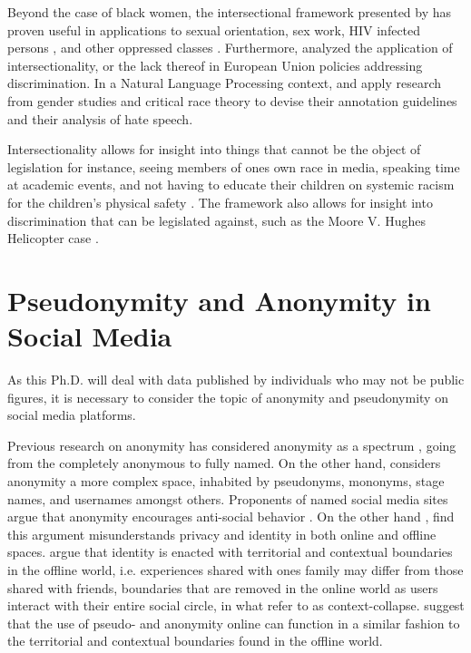 Beyond the case of black women, the intersectional framework presented by \cite{Crenshaw:1989} has proven useful in applications to sexual orientation, sex work, HIV infected persons \citep{Logie:2011}, and other oppressed classes \citep{Erevelles:2010}. Furthermore, \cite{Verloo:2006} analyzed the application of intersectionality, or the lack thereof in European Union policies addressing discrimination. In a Natural Language Processing context, \cite{Waseem-Hovy:2016} and \cite{Waseem:2016} apply research from gender studies and critical race theory to devise their annotation guidelines and their analysis of hate speech.

Intersectionality allows for insight into things that cannot be the object of legislation for instance, seeing members of ones own race in media, speaking time at academic events, and not having to educate their children on systemic racism for the children's physical safety \citep{McIntosh:1988}. The framework also allows for insight into discrimination that can be legislated against, such as the Moore V. Hughes Helicopter case \citep{Crenshaw:1989}.

\section{Pseudonymity and Anonymity in Social Media}\label{sec:pseudonymity}

As this Ph.D. will deal with data published by individuals who may not be public figures, it is necessary to consider the topic of anonymity and pseudonymity on social media platforms.

Previous research on anonymity has considered anonymity as a spectrum \citep{Qian:2007,Donath:1999}, going from the completely anonymous to fully named. On the other hand, \cite{Nagel:2015} considers anonymity a more complex space, inhabited by pseudonyms, mononyms, stage names, and usernames amongst others. Proponents of named social media sites argue that anonymity encourages anti-social behavior \citep{Galperin:2011}. On the other hand \cite{Nagel:2015}, find this argument misunderstands privacy and identity in both online and offline spaces. \cite{Nagel:2015} argue that identity is enacted with territorial and contextual boundaries in the offline world, i.e. experiences shared with ones family may differ from those shared with friends, boundaries that are removed in the online world as users interact with their entire social circle, in what \cite{Marwick:2011} refer to as context-collapse. \cite{Nagel:2015} suggest that the use of pseudo- and anonymity online can function in a similar fashion to the territorial and contextual boundaries found in the offline world. 

